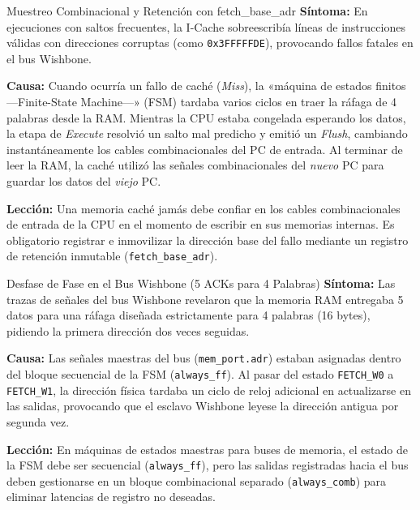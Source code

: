 \documentclass[10pt,a4paper]{article}
\begin{document}
\begin{bugbox}{Muestreo Combinacional y Retención con fetch\_base\_adr}
    \textbf{Síntoma:} En ejecuciones con saltos frecuentes, la I-Cache sobreescribía líneas de instrucciones válidas con direcciones corruptas (como 
    \texttt{0x3FFFFFDE}), provocando fallos fatales en el bus Wishbone.

    \textbf{Causa:} Cuando ocurría un fallo de caché (\textit{Miss}), la «máquina de estados finitos —Finite-State Machine—» (FSM) tardaba varios ciclos en traer la 
    ráfaga de 4 palabras desde la RAM. Mientras la CPU estaba congelada esperando los datos, la etapa de \textit{Execute} resolvió un salto mal predicho y emitió un 
    \textit{Flush}, cambiando instantáneamente los cables combinacionales del PC de entrada. Al terminar de leer la RAM, la caché utilizó las señales combinacionales 
    del \textit{nuevo} PC para guardar los datos del \textit{viejo} PC.

    \textbf{Lección:} Una memoria caché jamás debe confiar en los cables combinacionales de entrada de la CPU en el momento de escribir en sus memorias
    internas. Es obligatorio registrar e inmovilizar la dirección base del fallo mediante un registro de retención inmutable (\texttt{fetch\_base\_adr}).
\end{bugbox}

\begin{bugbox}{Desfase de Fase en el Bus Wishbone (5 ACKs para 4 Palabras)}
    \textbf{Síntoma:} Las trazas de señales del bus Wishbone \cite{wishbone_spec} revelaron que la memoria RAM entregaba 5 datos para una ráfaga diseñada estrictamente para 4 palabras
    (16 bytes), pidiendo la primera dirección dos veces seguidas.

    \textbf{Causa:} Las señales maestras del bus (\texttt{mem\_port.adr}) estaban asignadas dentro del bloque secuencial de la FSM (\texttt{always\_ff}). Al
    pasar del estado \texttt{FETCH\_W0} a \texttt{FETCH\_W1}, la dirección física tardaba un ciclo de reloj adicional en actualizarse en las salidas, provocando que
    el esclavo Wishbone leyese la dirección antigua por segunda vez.

    \textbf{Lección:} En máquinas de estados maestras para buses de memoria, el estado de la FSM debe ser secuencial (\texttt{always\_ff}), pero las
    salidas registradas hacia el bus deben gestionarse en un bloque combinacional separado (\texttt{always\_comb}) para eliminar latencias de registro no deseadas.
\end{bugbox}
\end{document}
